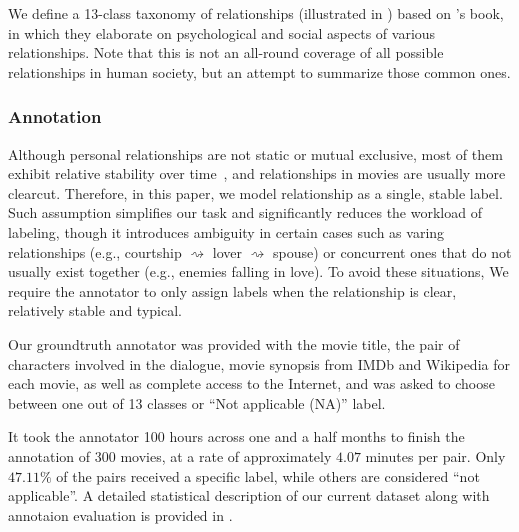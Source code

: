 We define a 13-class taxonomy of relationships
(illustrated in ) 
based on \citeauthor{encyclopedia}'s book, 
in which they elaborate on psychological 
and social aspects of various relationships. 
Note that this is not an all-round coverage of 
all possible relationships in human society, 
but an attempt to summarize those common ones.

\subsubsection*{Annotation}
Although personal relationships are not static or mutual exclusive, 
most of them exhibit relative stability over time~\cite{stability}, and
 relationships in movies are usually more clearcut. 
Therefore, in this paper, we model relationship as a single, 
stable label. Such assumption simplifies our task and 
significantly reduces the workload of labeling, though it introduces 
ambiguity in certain cases such as varing relationships 
(e.g., courtship $\rightsquigarrow$ lover $\rightsquigarrow$ spouse) or 
concurrent ones that do not usually exist together
(e.g., enemies falling in love). To avoid these situations, We require the annotator to only 
assign labels when the relationship is clear, relatively stable and typical.

Our groundtruth annotator was provided with the movie title, 
the pair of characters involved in the dialogue, 
movie synopsis from IMDb and Wikipedia for each movie, 
as well as complete access to the Internet, 
and was asked to choose between one out of 13 classes or 
``Not applicable (NA)'' label. 

It took the annotator 100 hours across one and a half months to 
finish the annotation of 300 movies, at a rate of approximately 
$4.07$ minutes per pair. Only $47.11\%$ of the pairs
received a specific label, while others are considered ``not applicable''. 
A detailed statistical description of our current dataset 
along with annotaion evaluation is provided in .

